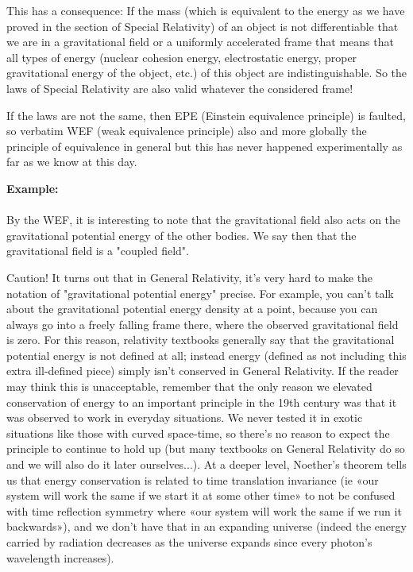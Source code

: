 	This has a consequence: If the mass (which is equivalent to the energy as we have proved in the section of Special Relativity) of an object is not differentiable that we are in a gravitational field or a uniformly accelerated frame that means that all types of energy (nuclear cohesion energy, electrostatic energy, proper gravitational energy of the object, etc.) of this object are indistinguishable. So the laws of Special Relativity are also valid whatever the considered frame!
	
	If the laws are not the same, then EPE (Einstein equivalence principle) is faulted, so verbatim WEF (weak equivalence principle) also and more globally the principle of equivalence in general but this has never happened experimentally as far as we know at this day.

	\begin{tcolorbox}[colframe=black,colback=white,sharp corners]
	\textbf{{\Large {}}Example:}\\\\
	By the WEF, it is interesting to note that the gravitational field also acts on the gravitational potential energy of the other bodies. We say then that the gravitational field is a "coupled field".
	\end{tcolorbox} 
	
	\begin{tcolorbox}[colback=red!5,borderline={1mm}{2mm}{red!5},arc=0mm,boxrule=0pt]
	\bcbombe Caution! It turns out that in General Relativity, it's very hard to make the notation of "gravitational potential energy" precise. For example, you can't talk about the gravitational potential energy density at a point, because you can always go into a freely falling frame there, where the observed gravitational field is zero. For this reason, relativity textbooks generally say that the gravitational potential energy is not defined at all; instead energy (defined as not including this extra ill-defined piece) simply isn't conserved in General Relativity. If the reader may think this is unacceptable, remember that the only reason we elevated conservation of energy to an important principle in the 19th century was that it was observed to work in everyday situations. We never tested it in exotic situations like those with curved space-time, so there's no reason to expect the principle to continue to hold up (but many textbooks on General Relativity do so and we will also do it later ourselves...). At a deeper level, Noether's theorem tells us that energy conservation is related to time translation invariance (ie «our system will work the same if we start it at some other time» to not be confused with time reflection symmetry where «our system will work the same if we run it backwards»), and we don't have that in an expanding universe (indeed the energy carried by radiation decreases as the universe expands since every photon's wavelength increases).
	\end{tcolorbox}
	
